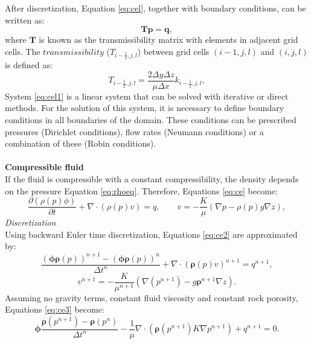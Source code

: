 \documentclass[12pt]{article}
\begin{document}
After discretization, Equation \eqref{eq:cel}, together with boundary conditions, can be written as:
 \begin{equation}\label{eq:cel1}
\mathbf{T}\mathbf{p} = \mathbf{q},
\end{equation}
where $\mathbf{T}$ is known as the transmissibility matrix with elements in adjacent grid cells. The $transmissibility$ ($T_{i-\frac{1}{2},j,l}$) between grid cells $(i-1,j,l)$ and $(i,j,l)$ is defined as:
\begin{equation}\label{eq:htrans}
 T_{i-\frac{1}{2},j,l}=\frac{2\Delta y \Delta z}{\mu\Delta x}k_{i-\frac{1}{2},j,l},
\end{equation} 
System \eqref{eq:cel1} is a linear system that can be solved with iterative or direct methods. For the solution of this system, it is necessary to define boundary conditions in all boundaries of the domain. These conditions can be prescribed pressures 
(Dirichlet conditions), flow rates (Neumann conditions) or a combination of these (Robin conditions).  \\\\
\textbf{Compressible fluid}\\
If the fluid is compressible with a constant compressibility, the density depends on the pressure Equation \eqref{eq:rhoeq}. Therefore, Equations \eqref{eq:ce} become:
\begin{equation}\label{eq:ce2}
\frac{\partial (\rho(p) \phi)}{\partial t}+ \nabla \cdot ( \rho(p) {v})=q, \qquad v=-\frac{K}{\mu}(\nabla p-\rho(p) g\nabla z),
\end{equation}
\emph{Discretization}\\
Using backward Euler time discretization, Equations \eqref{eq:ce2} are approximated by:
\begin{equation*}
 \frac{(\mathbf{\phi}\mathbf{\rho}(p))^{n+1}-(\mathbf{\phi}\mathbf{\rho}(p))^{n}}{\Delta t^n}
 +\nabla \cdot (\mathbf{\rho}({p}) v)^{n+1}={q}^{n+1},
\end{equation*}
\begin{equation}\label{eq:ce3}
{v}^{n+1}= -\frac{{K}}{\mu^{n+1}}(\nabla({p}^{n+1})-g\mathbf{\rho}^{n+1}\nabla{z}).
\end{equation}
Assuming no gravity terms, constant fluid viscosity and constant rock porosity, Equations \eqref{eq:ce3}
become:
\begin{equation}\label{eq:ce4}
 \mathbf{\phi}\frac{\mathbf{\rho}({p}^{n+1})
 -\mathbf{\rho}({p}^{n})}{\Delta t^n}
 -\frac{1}{\mu}\nabla \cdot (\mathbf{\rho}({p}^{n+1}) 
 {K}\nabla{p}^{n+1})+{q}^{n+1}=0.
\end{equation}
\end{document}
